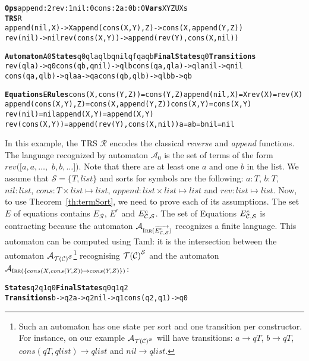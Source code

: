 \documentclass[a4paper,11pt]{llncs}
\newcommand{\A}{\mathcal{A}}
\def \R {\mathcal{R}}
\newcommand{\C}{{\cal C}}
\newcommand{\TC}{{\cal T(C)}}
\def\sorts{\mathcal S}
\def\ETF{E^{r}}
\def\Eccs{E^c_{\C,\sorts}}
\def\TCS{\TC^\sorts}
\DeclareMathOperator{\lirr}{I\textsc{rr}}
\newcommand{\airr}[1]{\A_{\lirr(#1)}}
\def\ERccs{\overrightarrow{\Eccs}}
\newcommand{\rw}{\rightarrow}
\def\timFont{\bf}
\newcommand{\Ops}{{\timFont Ops}}
\newcommand{\Vars}{{\timFont Vars}}
\newcommand{\TRS}{{\timFont TRS}}
\newcommand{\Automaton}{{\timFont Automaton}}
\newcommand{\States}{{\timFont States}}
\newcommand{\FinalStates}{{\timFont Final States}}
\newcommand{\Transitions}{{\timFont Transitions}}
\newcommand{\Equations}{{\timFont Equations}}
\newcommand{\Rules}{{\timFont Rules}}
\theoremstyle{plain}
\begin{document}
{\footnotesize
\begin{alltt}
\Ops append:2 rev:1 nil:0 cons:2 a:0 b:0   \Vars X Y Z U Xs    
\TRS R
append(nil,X)->X     append(cons(X,Y),Z)->cons(X,append(Y,Z))                         
rev(nil)->nil        rev(cons(X,Y))->append(rev(Y),cons(X,nil))

\Automaton A0 \States q0 qla qlb qnil qf qa qb \FinalStates q0 \Transitions
rev(qla)->q0         cons(qb,qnil)->qlb    cons(qa,qla)->qla    nil->qnil
cons(qa,qlb)->qla    a->qa                 cons(qb,qlb)->qlb    b->qb

\Equations E \Rules    cons(X,cons(Y,Z))=cons(Y,Z)  append(nil,X)=X                             rev(X)=rev(X)   
append(cons(X,Y),Z)=cons(X,append(Y,Z))     cons(X,Y)=cons(X,Y)    
rev(nil)=nil                                append(X,Y)=append(X,Y)                     
rev(cons(X,Y))=append(rev(Y),cons(X,nil))   a=a  b=b  nil=nil                            
\end{alltt}
}

\noindent
In this example, the TRS $\R$ encodes the classical {\em reverse} and {\em
  append} functions. The language recognized by automaton $\A_0$ is the set of
terms of the form $rev([a, a, \ldots,$ $b, b, \ldots])$. Note that there are at
least one $a$ and one $b$ in the list. We assume that $\sorts=\{T,list\}$ and
sorts for symbols are the following: $a:T$, $b:T$, $nil: list$, $cons: T \times
list \mapsto list$, $append: list \times list \mapsto list$ and $rev: list
\mapsto list$. Now, to use Theorem~\ref{th:termSort}, we need to prove each of
its assumptions.  The set $E$ of equations contains $E_\R$, $\ETF$ and
$\Eccs$. The set of Equations $\Eccs$ is contracting because the automaton
$\airr{\ERccs}$ recognizes a finite language. This automaton can be computed
using Taml: it is the intersection between the automaton
$\A_{\TCS}$\footnote{Such an automaton has one
  state per sort and one transition per constructor. For instance, on our
  example $\A_{\TCS}$ will have transitions: $a \rw qT$, $b \rw qT$,
  $cons(qT,qlist) \rw qlist$ and $nil \rw qlist$.}  recognising $\TCS$ and the
automaton $\airr{\{cons(X,cons(Y,Z)) \rw cons(Y,Z)\}}$:

{\footnotesize
\begin{alltt}
\States q2 q1 q0 \FinalStates q0 q1 q2 
\Transitions b->q2 a->q2 nil->q1 cons(q2,q1)->q0
\end{alltt}
}
\end{document}
